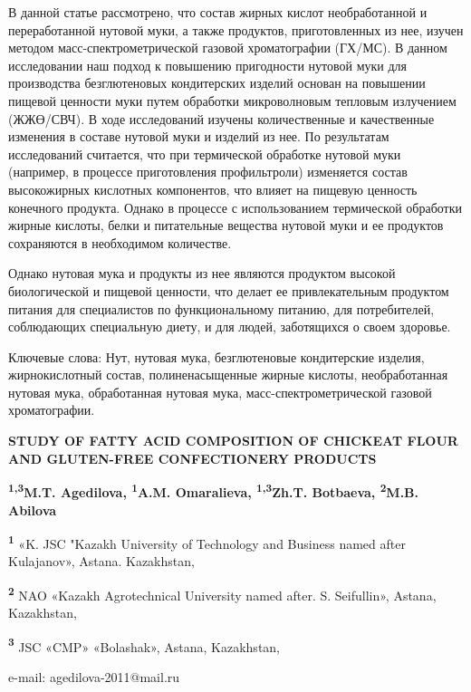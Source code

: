 В данной статье рассмотрено, что состав жирных кислот необработанной и
переработанной нутовой муки, а также продуктов, приготовленных из нее,
изучен методом масс-спектрометрической газовой хроматографии (ГХ/МС). В
данном исследовании наш подход к повышению пригодности нутовой муки для
производства безглютеновых кондитерских изделий основан на повышении
пищевой ценности муки путем обработки микроволновым тепловым излучением
(ЖЖӨ/СВЧ). В ходе исследований изучены количественные и качественные
изменения в составе нутовой муки и изделий из нее. По результатам
исследований считается, что при термической обработке нутовой муки
(например, в процессе приготовления профильтроли) изменяется состав
высокожирных кислотных компонентов, что влияет на пищевую ценность
конечного продукта. Однако в процессе с использованием термической
обработки жирные кислоты, белки и питательные вещества нутовой муки и ее
продуктов сохраняются в необходимом количестве.

Однако нутовая мука и продукты из нее являются продуктом высокой
биологической и пищевой ценности, что делает ее привлекательным
продуктом питания для специалистов по функциональному питанию, для
потребителей, соблюдающих специальную диету, и для людей, заботящихся о
своем здоровье.

Ключевые слова: Нут, нутовая мука, безглютеновые кондитерские изделия,
жирнокислотный состав, полиненасыщенные жирные кислоты, необработанная
нутовая мука, обработанная нутовая мука, масс-спектрометрической газовой
хроматографии.
\begin{articleheader}

{\bfseries STUDY OF FATTY ACID COMPOSITION OF CHICKEAT FLOUR AND
GLUTEN-FREE CONFECTIONERY PRODUCTS}

{\bfseries \textsuperscript{1,3}M.T. Agedilova\textsuperscript{\envelope },
\textsuperscript{1}A.M. Omaralieva, \textsuperscript{1,3}Zh.T. Botbaeva,
\textsuperscript{2}M.B. Abilova}
\end{articleheader}
\begin{affiliation}
{\bfseries \textsuperscript{1}} «K. JSC "Kazakh University of Technology
and Business named after Kulajanov», Astana. Kazakhstan,

{\bfseries \textsuperscript{2}} NAO «Kazakh Agrotechnical University named after. S. Seifullin»,
Astana, Kazakhstan,

{\bfseries \textsuperscript{3}}  JSC «CMP» «Bolashak», Astana, Kazakhstan,

e-mail: agedilova-2011@mail.ru
\end{affiliation}

